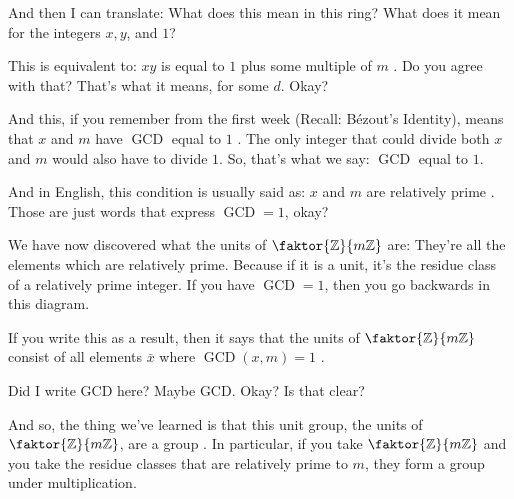 \begin{speech}[00:32:27 - 00:33:32]
And then I can translate: What does this mean in this ring? What does it mean for the integers $x, y$, and $1$?

This is equivalent to: $xy$ is equal to $1$ plus some multiple of $m$ . Do you agree with that? That's what it means, for some $d$. Okay?

And this, if you remember from the first week (Recall: Bézout's Identity), means that $x$ and $m$ have $\operatorname{GCD}$ equal to $1$ . The only integer that could divide both $x$ and $m$ would also have to divide $1$. So, that's what we say: $\operatorname{GCD}$ equal to $1$.

And in English, this condition is usually said as: $x$ and $m$ are relatively prime . Those are just words that express $\operatorname{GCD} = 1$, okay?
\end{speech}

\begin{speech}[00:33:32 - 00:35:02]
We have now discovered what the units of $\faktor{\mathbb{Z}}{m\mathbb{Z}}$ are: They're all the elements which are relatively prime. Because if it is a unit, it's the residue class of a relatively prime integer. If you have $\operatorname{GCD} = 1$, then you go backwards in this diagram.

If you write this as a result, then it says that the units of $\faktor{\mathbb{Z}}{m\mathbb{Z}}$ consist of all elements $\bar{x}$ where $\operatorname{GCD}(x, m) = 1$ .

Did I write GCD here? Maybe GCD. Okay? Is that clear?

And so, the thing we've learned is that this unit group, the units of $\faktor{\mathbb{Z}}{m\mathbb{Z}}$, are a group . In particular, if you take $\faktor{\mathbb{Z}}{m\mathbb{Z}}$ and you take the residue classes that are relatively prime to $m$, they form a group under multiplication.
\end{speech}

